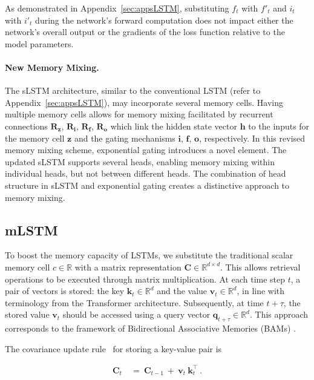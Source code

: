 As demonstrated in Appendix~\ref{sec:appsLSTM}, substituting $f_t$ with $f'_t$ and $i_t$ with $i'_t$ during the network’s forward computation does not impact either the network's overall output or the gradients of the loss function relative to the model parameters.

\paragraph{New Memory Mixing.} The sLSTM architecture, similar to the conventional LSTM (refer to Appendix~\ref{sec:appsLSTM}), may incorporate several memory cells. Having multiple memory cells allows for memory mixing facilitated by recurrent connections $\mathbf{R}_{\mathbf{z}}$, $\mathbf{R}_{\mathbf{i}}$, $\mathbf{R}_{\mathbf{f}}$, $\mathbf{R}_{\mathbf{o}}$ 
which link the hidden state vector $\mathbf{h}$ to the inputs for the memory cell $\mathbf{z}$ and the gating mechanisms
$\mathbf{i}$, $\mathbf{f}$, $\mathbf{o}$, respectively. In this revised memory mixing scheme, exponential gating introduces a novel element. The updated sLSTM supports several heads, enabling memory mixing within individual heads, but not between different heads. The combination of head structure in sLSTM and exponential gating creates a distinctive approach to memory mixing.

\subsection{mLSTM}
\label{sec:mLSTM}

To boost the memory capacity of LSTMs, we substitute the traditional scalar memory cell $c \in \mathbb{R}$ with a matrix representation $\mathbf{C} \in \mathbb{R}^{d \times d}$. This allows retrieval operations to be executed through matrix multiplication. At each time step $t$, a pair of vectors is stored: the key $\mathbf{k}_t \in \mathbb{R}^d$ and the value $\mathbf{v}_t \in \mathbb{R}^d$, in line with terminology from the Transformer architecture. Subsequently, at time $t + \tau$, the stored value $\mathbf{v}_t$ should be accessed using a query vector $\mathbf{q}_{t+\tau} \in \mathbb{R}^d$. This approach corresponds to the framework of Bidirectional Associative Memories (BAMs) \citep{Kohonen:72,Anderson:72,Nakano:72,Anderson:77}.

The covariance update rule~\citep{Sejnowski:77,Dayan:91} for storing a key-value pair is

\begin{align}
\mathbf{C}_t \ &= \ \mathbf{C}_{t-1} \ + \ \mathbf{v}_{t} \ \mathbf{k}_t^\top \ .
\end{align}

